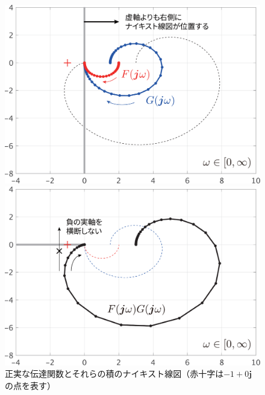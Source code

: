 \documentclass[a4j,10pt,oneside,openany,dvipdfmx]{jsbook}
\begin{document}
\begin{figure}[t]
  \centering
  {
  \begin{minipage}{0.49\linewidth}
    \centering
    \includegraphics[width = .90\linewidth]{figs/nyquistFG}
  \end{minipage}
  \begin{minipage}{0.49\linewidth}
    \centering
    \includegraphics[width = .90\linewidth]{figs/nyquistFGop}
  \end{minipage}
  \caption{正実な伝達関数とそれらの積のナイキスト線図（赤十字は$-1 + 0 \bm{j}$の点を表す）}
  \label{fig:nyquistpr}
  }
\end{figure}
\end{document}
